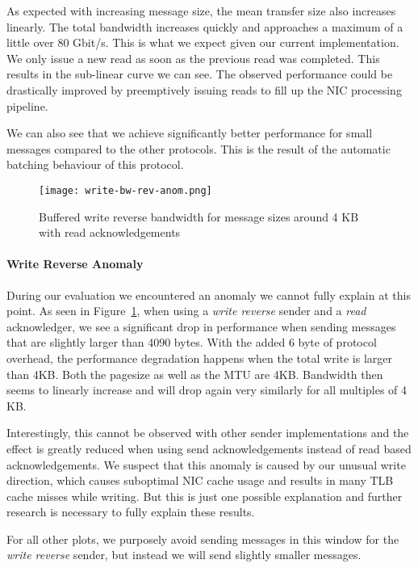 As expected with increasing message size, the mean transfer size also increases linearly. The total bandwidth 
increases quickly and approaches a maximum of a little over 80 Gbit/s. This is what we expect given our current 
implementation. We only issue a new read as soon as the previous read was completed. This results in the sub-linear
curve we can see. The observed performance could be drastically improved by preemptively issuing reads to fill up
the NIC processing pipeline.

We can also see that we achieve significantly better performance for small messages compared to the other protocols. 
This is the result of the automatic batching behaviour of this protocol. 


\begin{figure}[h]
\texttt{[image: write-bw-rev-anom.png]}
\caption{Buffered write reverse bandwidth for message sizes around 4 KB with read acknowledgements}
\label{fig:plot-write-rev-anom}
\end{figure}

\paragraph{Write Reverse Anomaly} During our evaluation we encountered an anomaly we cannot fully explain at
this point. As seen in Figure~\ref{fig:plot-write-rev-anom}, when using a \emph{write reverse} sender and a 
\emph{read} acknowledger, we see a significant drop in performance when sending messages that are slightly larger
than 4090 bytes. 
With the added 6 byte of protocol overhead, the performance degradation happens when the total write is larger than 4KB.
Both the pagesize as well as the MTU are 4KB. Bandwidth then seems to linearly increase and will drop again very similarly 
for all multiples of 4 KB.

Interestingly, this cannot be observed with other sender implementations and the effect is greatly
reduced when using send acknowledgements instead of read based acknowledgements.
We suspect that this anomaly is caused by our unusual write direction, which causes suboptimal NIC cache usage and 
results in many TLB cache misses while writing. But this is just one possible explanation and further research is 
necessary to fully explain these results.

For all other plots, we purposely avoid sending messages in this window for the \emph{write reverse}
sender, but instead we will send slightly smaller messages.

